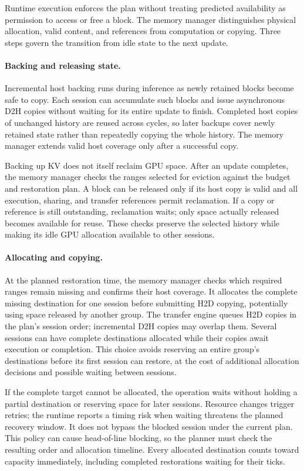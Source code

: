 Runtime execution enforces the plan without treating predicted availability as permission to access or free a block.
The memory manager distinguishes physical allocation, valid content, and references from computation or copying.
Three steps govern the transition from idle state to the next update.

\paragraph{Backing and releasing state.}
Incremental host backing runs during inference as newly retained blocks become safe to copy.
Each session can accumulate such blocks and issue asynchronous D2H copies without waiting for its entire update to finish.
Completed host copies of unchanged history are reused across cycles, so later backups cover newly retained state rather than repeatedly copying the whole history.
The memory manager extends valid host coverage only after a successful copy.

Backing up KV does not itself reclaim GPU space.
After an update completes, the memory manager checks the ranges selected for eviction against the budget and restoration plan.
A block can be released only if its host copy is valid and all execution, sharing, and transfer references permit reclamation.
If a copy or reference is still outstanding, reclamation waits; only space actually released becomes available for reuse.
These checks preserve the selected history while making its idle GPU allocation available to other sessions.

\paragraph{Allocating and copying.}
\label{sec:design-prefetch}
At the planned restoration time, the memory manager checks which required ranges remain missing and confirms their host coverage.
It allocates the complete missing destination for one session before submitting H2D copying, potentially using space released by another group.
The transfer engine queues H2D copies in the plan's session order; incremental D2H copies may overlap them.
Several sessions can have complete destinations allocated while their copies await execution or completion.
This choice avoids reserving an entire group's destinations before its first session can restore, at the cost of additional allocation decisions and possible waiting between sessions.

If the complete target cannot be allocated, the operation waits without holding a partial destination or reserving space for later sessions.
Resource changes trigger retries; the runtime reports a timing risk when waiting threatens the planned recovery window.
It does not bypass the blocked session under the current plan.
This policy can cause head-of-line blocking, so the planner must check the resulting order and allocation timeline.
Every allocated destination counts toward capacity immediately, including completed restorations waiting for their ticks.

